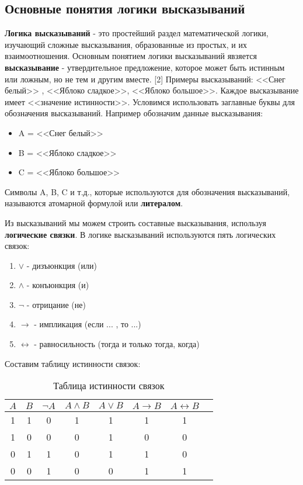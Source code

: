 \documentclass[12pt, a4paper]{article}
\begin{document}
	 \begin{center}
	 	\subsection{Основные понятия логики высказываний}
	 \end{center} 
	 \par \textbf{Логика высказываний }- это простейший раздел математической логики, изучающий сложные высказывания, образованные из простых, и их взаимоотношения. Основным понятием логики высказываний явзяется \textbf{высказывание} - утвердительное предложение, которое может быть истинным или ложным, но не тем и другим вместе. [2] Примеры высказываний: <<Снег белый>> , <<Яблоко сладкое>>, <<Яблоко большое>>. Каждое высказывание имеет <<значение истинности>>. Условимся использовать заглавные буквы для обозначения высказываний. Например обозначим данные высказывания:
	 \begin{itemize}
	 	\item A = <<Снег белый>>
	 	\item B = <<Яблоко сладкое>>
	 	\item C = <<Яблоко большое>>
	 \end{itemize}
	 Символы A, B, C и т.д., которые используются для обозначения высказываний, называются атомарной формулой или \textbf{литералом}.
	 \par Из высказываний мы можем строить составные высказывания, используя \textbf{логические связки}. В логике высказываний используются пять логических связок:
	 \begin{enumerate}
	 	\item $\lor$ - дизъюнкция (или)
	 	\item $\land$ - конъюнкция (и)
	 	\item $\neg$ - отрицание (не)
	 	\item $\rightarrow$ - импликация (если ... , то ...)
	 	\item $\leftrightarrow$ - равносильность (тогда и только тогда, когда) 
	 \end{enumerate}
	 Составим таблицу истинности связок:
	 \begin{table}[h!]
	 	\centering
	 	\begin{tabular}{|c|c|c|c|c|c|c|c|}
	 		\hline
	 		$A$ & $B$ & $\neg A$ & $A \land B$ & $A \lor B$ & $A \rightarrow B$ & $A \leftrightarrow B$ \\ \hline
	 		1 & 1 & 0 & 1 & 1 & 1 & 1 \\ \hline
	 		1 & 0 & 0 & 0 & 1 & 0 & 0 \\ \hline
	 		0 & 1 & 1 & 0 & 1 & 1 & 0 \\ \hline
	 		0 & 0 & 1 & 0 & 0 & 1 & 1 \\ \hline
	 	\end{tabular}
	 	\caption{Таблица истинности связок}
	 \end{table}\\
\end{document}
